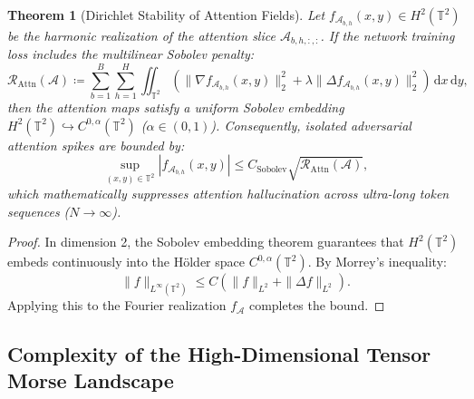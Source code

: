 \documentclass[11pt,a4paper,reqno]{amsart}
\newtheorem{theorem}{Theorem}[section]
\theoremstyle{definition}
\numberwithin{equation}{section}
\newcommand{\Tor}{\mathbb{T}}
\newcommand{\dif}{\,\mathrm{d}}
\begin{document}
\begin{theorem}[Dirichlet Stability of Attention Fields]
\label{thm:attention_sobolev}
Let $f_{\mathcal{A}_{b,h}}(x, y) \in H^2(\Tor^2)$ be the harmonic realization of the attention slice $\mathcal{A}_{b, h, :, :}$. If the network training loss includes the multilinear Sobolev penalty:
\begin{equation}
    \mathcal{R}_{\mathrm{Attn}}(\mathcal{A}) \coloneqq \sum_{b=1}^B \sum_{h=1}^H \iint_{\Tor^2} \left( \|\nabla f_{\mathcal{A}_{b,h}}(x, y)\|_2^2 + \lambda \|\Delta f_{\mathcal{A}_{b,h}}(x, y)\|_2^2 \right) \dif x \dif y,
\end{equation}
then the attention maps satisfy a uniform Sobolev embedding $H^2(\Tor^2) \hookrightarrow C^{0, \alpha}(\Tor^2)$ ($\alpha \in (0, 1)$). Consequently, isolated adversarial attention spikes are bounded by:
\begin{equation}
    \sup_{(x, y) \in \Tor^2} |f_{\mathcal{A}_{b,h}}(x, y)| \le C_{\mathrm{Sobolev}} \sqrt{\mathcal{R}_{\mathrm{Attn}}(\mathcal{A})},
\end{equation}
which mathematically suppresses attention hallucination across ultra-long token sequences ($N \to \infty$).
\end{theorem}
\begin{proof}
In dimension 2, the Sobolev embedding theorem guarantees that $H^2(\Tor^2)$ embeds continuously into the H\"older space $C^{0, \alpha}(\Tor^2)$. By Morrey's inequality:
\begin{equation}
    \|f\|_{L^\infty(\Tor^2)} \le C \left( \|f\|_{L^2} + \|\Delta f\|_{L^2} \right).
\end{equation}
Applying this to the Fourier realization $f_{\mathcal{A}}$ completes the bound.
\end{proof}

\subsection{Complexity of the High-Dimensional Tensor Morse Landscape}
\label{subsec:kac_rice_tensors}
\end{document}
